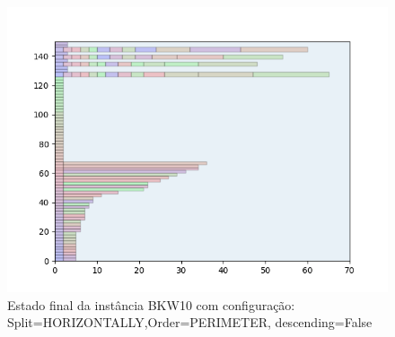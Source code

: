\begin{figure}[H]
    \centering
    \caption[]{Estado final da instância BKW10 com configuração: Split=HORIZONTALLY,Order=PERIMETER, descending=False}
    \label{fig:bkw10-horizontally-perimeter-false}
    \includegraphics[scale=0.5]{output/figures/bkw/bkw10/horizontally/perimeter/false/000}
\end{figure}